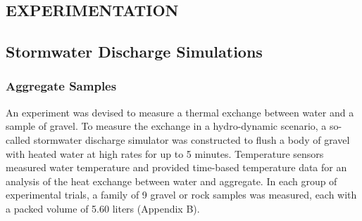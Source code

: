 

\begin{center}
\section{EXPERIMENTATION}
\end{center}

\subsection{Stormwater Discharge Simulations}

\subsubsection*{Aggregate Samples}
An experiment was devised to measure a thermal exchange between water and a sample of gravel. To measure the exchange in a hydro-dynamic scenario, a so-called stormwater discharge simulator was constructed to flush a body of gravel with heated water at high rates for up to 5 minutes. Temperature sensors measured water temperature and provided time-based temperature data for an analysis of the heat exchange between water and aggregate. In each group of experimental trials, a family of 9 gravel or rock samples was measured, each with a packed volume of 5.60 liters (Appendix B). 


